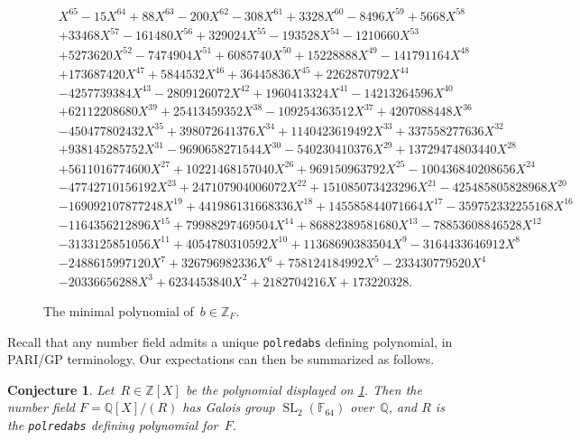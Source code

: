 \documentclass[12pt,oneside]{amsart}
\numberwithin{equation}{section}
\newtheorem{conj}[equation]{Conjecture}
\theoremstyle{definition}
\newcommand{\Z}{\mathbb{Z}}
\newcommand{\Q}{\mathbb{Q}}
\newcommand{\F}{\mathbb{F}}
\DeclareMathOperator{\SL}{SL}
\begin{document}
\begin{figure}
  \footnotesize
  \begin{align*}
    &X^{65} - 15X^{64} + 88X^{63} - 200X^{62} - 308X^{61} + 3328X^{60} - 8496X^{59} + 5668X^{58}\\ & + 33468X^{57} - 161480X^{56} + 329024X^{55} - 193528X^{54}- 1210660X^{53}\\ & + 5273620X^{52}- 7474904X^{51} + 6085740X^{50} + 15228888X^{49} - 141791164X^{48}\\ & + 173687420X^{47} + 5844532X^{46} + 36445836X^{45} + 2262870792X^{44} \\ & - 4257739384X^{43} - 2809126072X^{42} + 1960413324X^{41} - 14213264596X^{40}\\ & + 62112208680X^{39} + 25413459352X^{38} - 109254363512X^{37} + 4207088448X^{36}\\ & - 450477802432X^{35} + 398072641376X^{34} + 1140423619492X^{33} + 337558277636X^{32}\\ & + 938145285752X^{31} - 9690658271544X^{30} - 540230410376X^{29} + 13729474803440X^{28} \\ &+ 5611016774600X^{27} + 10221468157040X^{26} + 969150963792X^{25} - 100436840208656X^{24}\\ & - 47742710156192X^{23} + 247107904006072X^{22} + 151085073423296X^{21} - 425485805828968X^{20}\\ & - 169092107877248X^{19} + 441986131668336X^{18} + 145585844071664X^{17} - 359752332255168X^{16}\\ & - 1164356212896X^{15} + 79988297469504X^{14} + 86882389581680X^{13} - 78853608846528X^{12}\\ & - 3133125851056X^{11} + 4054780310592X^{10} + 11368690383504X^9 - 3164433646912X^8\\ & - 2488615997120X^7 + 326796982336X^6 + 758124184992X^5 - 233430779520X^4\\ & - 20336656288X^3 + 6234453840X^2 + 2182704216X + 173220328.
  \end{align*}
  \caption{The minimal polynomial of~$b\in \Z_F$.}
  \label{fig:minpoly-1}
\end{figure}


Recall that any number field admits a unique \texttt{polredabs} defining
polynomial, in PARI/GP terminology. Our expectations can then be summarized as
follows.

\begin{conj}
  \label{conj:1}
  Let~$R\in \Z[X]$ be the polynomial displayed on \cref{fig:minpoly-1}.  Then
  the number field $F = \Q[X]/(R)$ has Galois group $\SL_2(\F_{64})$ over~$\Q$,
  and $R$ is the \textup{\texttt{polredabs}} defining polynomial for~$F$.
\end{conj}
\end{document}
